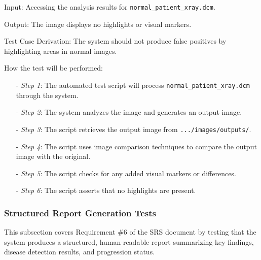 \documentclass[12pt, titlepage]{article}
\begin{document}
\begin{enumerate}
Input: Accessing the analysis results for \texttt{normal\_patient\_xray.dcm}.

Output: The image displays no highlights or visual markers.

Test Case Derivation: The system should not produce false positives by highlighting areas in normal images.

How the test will be performed:
\begin{itemize}
\item[-] \textit{Step 1}: The automated test script will process \texttt{normal\_patient\_xray.dcm} through the system.
\item[-] \textit{Step 2}: The system analyzes the image and generates an output image.
\item[-] \textit{Step 3}: The script retrieves the output image from \texttt{.../images/outputs/}.
\item[-] \textit{Step 4}: The script uses image comparison techniques to compare the output image with the original.
\item[-] \textit{Step 5}: The script checks for any added visual markers or differences.
\item[-] \textit{Step 6}: The script asserts that no highlights are present.
\end{itemize}
\end{enumerate}

\subsubsection{Structured Report Generation Tests}

This subsection covers Requirement \#6 of the SRS document by testing that the system produces a structured, human-readable report summarizing key findings, disease detection results, and progression status.
\end{document}
